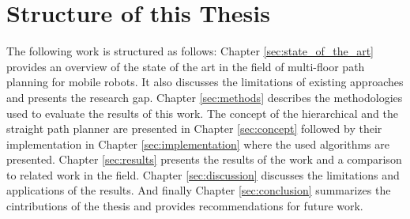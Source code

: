 \section{Structure of this Thesis}
\label{sec:structure}
The following work is structured as follows: Chapter \ref{sec:state_of_the_art} provides an overview of the state of the art in the field of multi-floor path planning for mobile robots. It also discusses the limitations of existing approaches and presents the research gap. Chapter \ref{sec:methods} describes the methodologies used to evaluate the results of this work. The concept of the hierarchical and the straight path planner are presented in Chapter \ref{sec:concept} followed by their implementation in Chapter \ref{sec:implementation} where the used algorithms are presented. Chapter \ref{sec:results} presents the results of the work and a comparison to related work in the field. Chapter \ref{sec:discussion} discusses the limitations and applications of the results. And finally Chapter \ref{sec:conclusion} summarizes the cintributions of the thesis and provides recommendations for future work.
